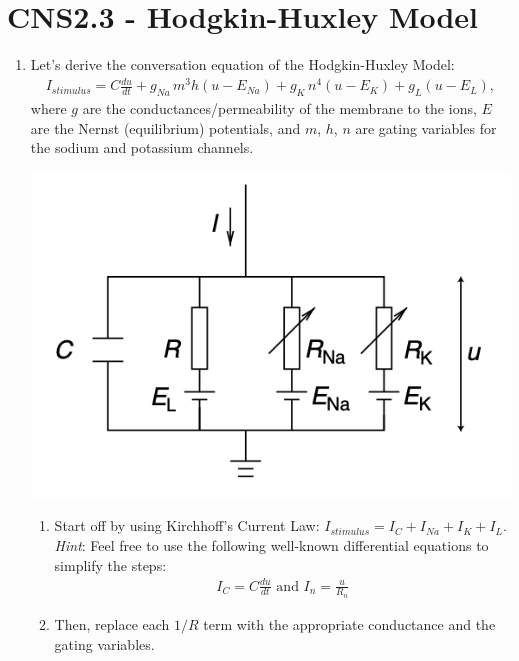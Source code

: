 \documentclass[11pt,letterpaper]{article}
\begin{document}
\pagebreak

\section{CNS2.3 - Hodgkin-Huxley Model}
\begin{enumerate}
    \item Let's derive the conversation equation of the Hodgkin-Huxley Model:
    \begin{align*}
        I_{stimulus} = C \frac{du}{dt} + g_{Na} \, m^3 h (u - E_{Na}) + g_K \, n^4 (u - E_K) + g_L (u - E_L),
    \end{align*}
    where $g$ are the conductances/permeability of the membrane to the ions, $E$ are the Nernst (equilibrium) potentials, and $m$, $h$, $n$ are gating variables for the sodium and potassium channels.
    \begin{center}
        \includegraphics[scale=0.9]{2.3.png}
    \end{center}
    \begin{enumerate}
        \item Start off by using Kirchhoff's Current Law: $I_{stimulus} = I_C + I_{Na} + I_K + I_L$. \emph{Hint}: Feel free to use the following well-known differential equations to simplify the steps:
        \begin{align*}
            I_C = C \frac{du}{dt} \text{  and  } I_n = \frac{u}{R_n}
        \end{align*}
        \vspace{1.2 in}
        \item Then, replace each $1/R$ term with the appropriate conductance and the gating variables.
        \vspace{2 in}
    \end{enumerate}
    \pagebreak


\end{enumerate}
\end{document}
